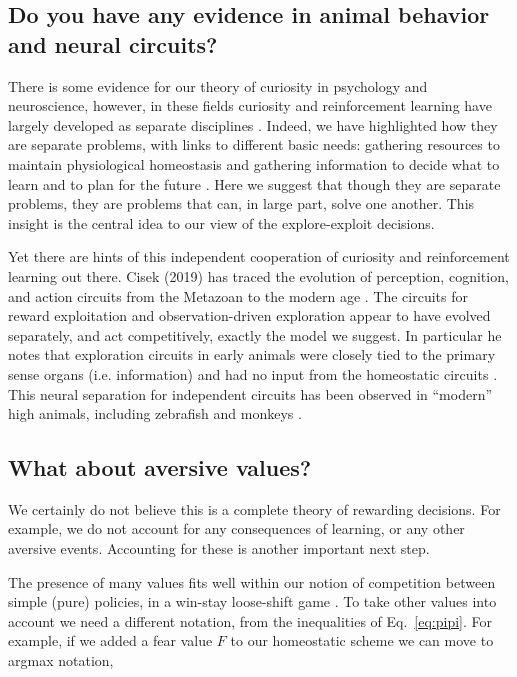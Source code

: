 \subsection*{Do you have any evidence in animal behavior and neural circuits?}
There is some evidence for our theory of curiosity in psychology and neuroscience, however, in these fields curiosity and reinforcement learning have largely developed as separate disciplines \citep{Berlyne1950,Kidd2015,Sutton2018}. Indeed, we have highlighted how they are separate problems, with links to different basic needs: gathering resources to maintain physiological homeostasis \citep{Keramati2014,Juechems2019} and gathering information to decide what to learn and to plan for the future \citep{Valiant1984,Sutton2018}. Here we suggest that though they are separate problems, they are problems that can, in large part, solve one another. This insight is the central idea to our view of the explore-exploit decisions. 

Yet there are hints of this independent cooperation of curiosity and reinforcement learning out there. Cisek (2019) has traced the evolution of perception, cognition, and action circuits from the Metazoan to the modern age \citep{Cisek2019}. The circuits for reward exploitation and observation-driven exploration appear to have evolved separately, and act competitively, exactly the model we suggest. In particular he notes that exploration circuits in early animals were closely tied to the primary sense organs (i.e. information) and had no input from the homeostatic circuits \citep{Keramati2014,Cisek2019,Juechems2019}. This neural separation for independent circuits has been observed in ``modern'' high animals, including zebrafish \citep{Marques2019} and monkeys \citep{White2019,Wang2019}. 


\subsection*{What about aversive values?}
We certainly do not believe this is a complete theory of rewarding decisions. For example, we do not account for any consequences of learning, or any other aversive events. Accounting for these is another important next step.

The presence of many values fits well within our notion of competition between simple (pure) policies, in a win-stay loose-shift game \cite{Estes1994TowardAS}. To take other values into account we need a different notation, from the inequalities of Eq.~\ref{eq:pipi}. For example, if we added a fear value $F$ to our homeostatic scheme we can move to argmax notation,

